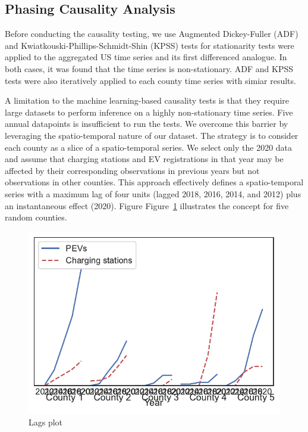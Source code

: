 \documentclass[
  letterpaper,
  DIV=11,
  numbers=noendperiod]{scrartcl}
\begin{document}
\hypertarget{phasing-causality-analysis}{%
\subsection{Phasing Causality
Analysis}\label{phasing-causality-analysis}}

Before conducting the causality testing, we use Augmented Dickey-Fuller
(ADF) and Kwiatkouski-Phillips-Schmidt-Shin (KPSS) tests for
stationarity tests were applied to the aggregated US time series and its
first differenced analogue. In both cases, it was found that the time
series is non-stationary. ADF and KPSS tests were also iteratively
applied to each county time series with simiar results.

A limitation to the machine learning-based causality tests is that they
require large datasets to perform inference on a highly non-stationary
time series. Five annual datapoints is insufficient to run the tests. We
overcome this barrier by leveraging the spatio-temporal nature of our
dataset. The strategy is to consider each county as a slice of a
spatio-temporal series. We select only the 2020 data and assume that
charging stations and EV registrations in that year may be affected by
their corresponding observations in previous years but not observations
in other counties. This approach effectively defines a spatio-temporal
series with a maximum lag of four units (lagged 2018, 2016, 2014, and
2012) plus an instantaneous effect (2020). Figure Figure~\ref{fig-lags}
illustrates the concept for five random counties.

\begin{figure}

{\centering \includegraphics{TRB_2023_files/figure-pdf/fig-lags-output-1.pdf}

}

\caption{\label{fig-lags}Lags plot}

\end{figure}
\end{document}
